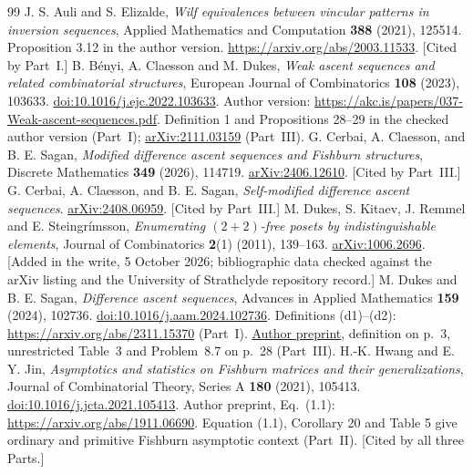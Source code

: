 \documentclass[11pt,a4paper]{article}
\theoremstyle{remark}\newtheorem{remark}[theorem]{Remark}
\numberwithin{equation}{section}
\begin{document}
\begingroup\raggedright
\begin{thebibliography}{99}
 J. S. Auli and S. Elizalde, \emph{Wilf equivalences between vincular patterns in inversion sequences}, Applied Mathematics and Computation \textbf{388} (2021), 125514. Proposition 3.12 in the author version. \url{https://arxiv.org/abs/2003.11533}. [Cited by Part~I.]
 B. B\'enyi, A. Claesson and M. Dukes, \emph{Weak ascent sequences and related combinatorial structures}, European Journal of Combinatorics \textbf{108} (2023), 103633. \href{https://doi.org/10.1016/j.ejc.2022.103633}{doi:10.1016/j.ejc.2022.103633}. Author version: \url{https://akc.is/papers/037-Weak-ascent-sequences.pdf}. Definition 1 and Propositions 28--29 in the checked author version (Part~I); \href{https://arxiv.org/abs/2111.03159}{arXiv:2111.03159} (Part~III).
 G. Cerbai, A. Claesson, and B. E. Sagan, \emph{Modified difference ascent sequences and Fishburn structures}, Discrete Mathematics \textbf{349} (2026), 114719. \href{https://arxiv.org/abs/2406.12610}{arXiv:2406.12610}. [Cited by Part~III.]
 G. Cerbai, A. Claesson, and B. E. Sagan, \emph{Self-modified difference ascent sequences}. \href{https://arxiv.org/abs/2408.06959}{arXiv:2408.06959}. [Cited by Part~III.]
 M. Dukes, S. Kitaev, J. Remmel and E. Steingr\'imsson, \emph{Enumerating $(2+2)$-free posets by indistinguishable elements}, Journal of Combinatorics \textbf{2}(1) (2011), 139--163. \href{https://arxiv.org/abs/1006.2696}{arXiv:1006.2696}. [Added in the write, 5 October 2026; bibliographic data checked against the arXiv listing and the University of Strathclyde repository record.]
 M. Dukes and B. E. Sagan, \emph{Difference ascent sequences}, Advances in Applied Mathematics \textbf{159} (2024), 102736. \href{https://doi.org/10.1016/j.aam.2024.102736}{doi:10.1016/j.aam.2024.102736}. Definitions (d1)--(d2): \url{https://arxiv.org/abs/2311.15370} (Part~I). \href{https://users.math.msu.edu/users/bsagan/Papers/Old/das.pdf}{Author preprint}, definition on p.~3, unrestricted Table~3 and Problem~8.7 on p.~28 (Part~III).
 H.-K. Hwang and E. Y. Jin, \emph{Asymptotics and statistics on Fishburn matrices and their generalizations}, Journal of Combinatorial Theory, Series A \textbf{180} (2021), 105413. \href{https://doi.org/10.1016/j.jcta.2021.105413}{doi:10.1016/j.jcta.2021.105413}. Author preprint, Eq.~(1.1): \url{https://arxiv.org/abs/1911.06690}. Equation (1.1), Corollary 20 and Table 5 give ordinary and primitive Fishburn asymptotic context (Part~II). [Cited by all three Parts.]

\end{thebibliography}
\end{document}
